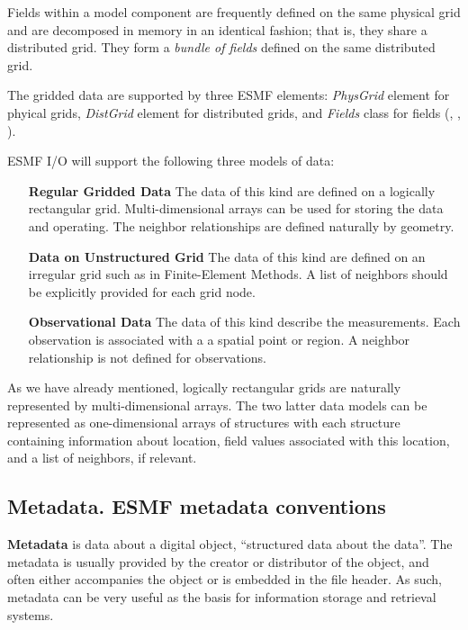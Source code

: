 Fields within a model component are frequently defined on the same
physical grid and are decomposed in memory in an identical fashion;
that is, they share a distributed grid. They form a {\em bundle of
fields} defined on the same distributed grid. 

The gridded data are supported by three ESMF elements: {\em PhysGrid} element 
for phyical grids, {\em DistGrid} element for distributed grids, and 
{\em Fields} class for fields (\cite{ESMF-PhysGrid-Req},
\cite{ESMF-DistGrid-Req}, \cite{ESMF-Field-Req}). 

ESMF I/O will support the following three models of data: 

\begin{itemize}
\item[\bf Regular Gridded Data] The data of this kind are defined on a
logically rectangular grid. Multi-dimensional arrays can be used for
storing the data and operating. The neighbor relationships are defined
naturally by geometry.

\item[\bf Data on Unstructured Grid] The data of this kind are defined on an 
irregular grid such as in Finite-Element Methods. A list of neighbors should 
be explicitly provided for each grid node. 

\item[\bf Observational Data] The data of this kind describe the 
measurements. Each observation is associated with a a spatial point or region.
A neighbor relationship is not defined for observations. 
\end{itemize}

As we have already mentioned, logically rectangular grids are naturally 
represented by multi-dimensional arrays. The two latter data models can be 
represented as one-dimensional arrays of structures with each structure 
containing information about location, field values associated with this 
location, and a list of neighbors, if relevant. 

\subsection{Metadata. ESMF metadata conventions}

{\bf Metadata} is data about a digital object, ``structured data about the 
data''. The metadata is usually provided by the creator or distributor of 
the object, and often either accompanies the object or is embedded in the 
file header. As such, metadata can be very useful as the basis for 
information storage and retrieval systems.

